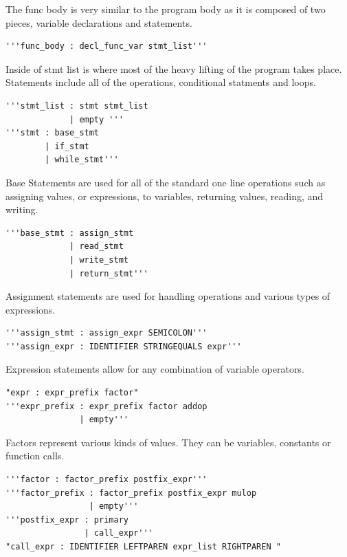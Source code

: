\documentclass[12pt]{article}
\begin{document}
           The func body is very similar to the program body as it is composed of two pieces, variable declarations and statements.
           
           \begin{verbatim}
'''func_body : decl_func_var stmt_list'''
           \end{verbatim}
           
           Inside of stmt list is where most of the heavy lifting of the program takes place.  Statements include all of the operations, conditional statments and loops.
           
            \begin{verbatim}
'''stmt_list : stmt stmt_list
             | empty '''
'''stmt : base_stmt
        | if_stmt
        | while_stmt'''
           \end{verbatim}
           
           Base Statements are used for all of the standard one line operations such as assigning values, or expressions, to variables, returning values, reading, and writing.
           \begin{verbatim}
'''base_stmt : assign_stmt
             | read_stmt
             | write_stmt
             | return_stmt'''
           \end{verbatim}
           
           Assignment statements are used for handling operations and various types of expressions.
           
           \begin{verbatim}
'''assign_stmt : assign_expr SEMICOLON'''
'''assign_expr : IDENTIFIER STRINGEQUALS expr'''
            \end{verbatim}      
           
            Expression statements allow for any combination of variable operators.  
            
            \begin{verbatim}
"expr : expr_prefix factor"      
'''expr_prefix : expr_prefix factor addop
               | empty'''
            \end{verbatim}     
            
            Factors represent various kinds of values.  They can be variables, constants or function calls.
            
            \begin{verbatim}
'''factor : factor_prefix postfix_expr'''
'''factor_prefix : factor_prefix postfix_expr mulop
                 | empty'''
'''postfix_expr : primary
                | call_expr'''  
"call_expr : IDENTIFIER LEFTPAREN expr_list RIGHTPAREN "                                          
            \end{verbatim}  
            
\end{document}
